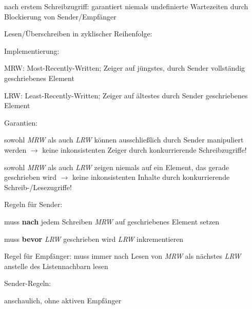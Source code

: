 \documentclass[a4paper]{article}
\begin{document}
\begin{multicols}{3}
    \begin{itemize*}
        \item
        nach erstem Schreibzugriff: garantiert niemals undefinierte
        Wartezeiten durch Blockierung von Sender/Empfänger
        \item
        Lesen/Überschreiben in zyklischer Reihenfolge:
        \item
        Implementierung:
        \begin{itemize*}
            \item MRW: Most-Recently-Written; Zeiger auf jüngstes, durch Sender vollständig geschriebenes Element
            \item LRW: Least-Recently-Written; Zeiger auf ältestes durch Sender geschriebenes Element
            \item Garantien: \begin{itemize*} \item sowohl \emph{MRW} als auch \emph{LRW} können ausschließlich durch Sender manipuliert werden $\rightarrow$ keine inkonsistenten Zeiger durch konkurrierende Schreibzugriffe! \item sowohl \emph{MRW} als auch \emph{LRW} zeigen niemals auf ein Element, das gerade geschrieben wird $\rightarrow$ keine inkonsistenten Inhalte durch konkurrierende Schreib-/Lesezugriffe! \end{itemize*}
            \item Regeln für Sender: \begin{itemize*} \item muss \textbf{nach} jedem Schreiben \emph{MRW} auf geschriebenes Element setzen \item muss \textbf{bevor} \emph{LRW} geschrieben wird \emph{LRW} inkrementieren \end{itemize*}
            \item Regel für Empfänger: muss immer nach Lesen von \emph{MRW} als nächstes \emph{LRW} anstelle des Listennachbarn lesen
        \end{itemize*}
        \item
        Sender-Regeln:
        \begin{itemize*}
            \item anschaulich, ohne aktiven Empfänger

\end{itemize*}
\end{itemize*}
\end{multicols}
\end{document}
